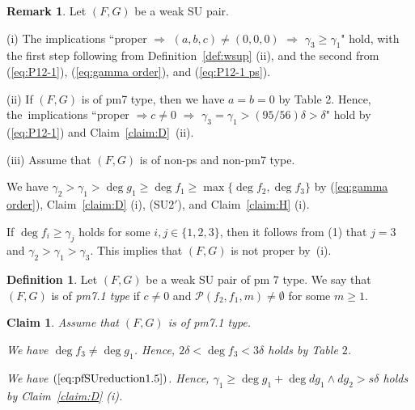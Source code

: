 \documentclass{amsart}
\theoremstyle{plain}
\newtheorem{claim}{Claim}
\theoremstyle{definition}
\newtheorem{definition}[thm]{Definition}
\newtheorem{rem}[thm]{Remark}
\newcommand{\nd}{\noindent}
\begin{document}
\begin{rem}\label{rem:diff forms}\rm 
Let $(F,G)$ be a weak SU pair. 


\nd (i) 
The implications 
``proper $\Rightarrow $ $(a,b,c)\ne (0,0,0)$ 
$\Rightarrow $ $\gamma _3\ge \gamma _1$" hold, 
with the first step following from Definition~\ref{def:wsup} (ii), 
and the second from 
(\ref{eq:P12-1}), 
(\ref{eq:gamma order}), 
and (\ref{eq:P12-1 ps}). 


\nd (ii) 
If $(F,G)$ is of pm7 type, 
then we have $a=b=0$ by Table 2. 
Hence, 
the~implications 
``proper 
$\Rightarrow c\ne 0$ 
$\Rightarrow $ 
$\gamma _3=\gamma _1>(95/56)\delta >\delta $" 
hold by (\ref{eq:P12-1}) and Claim~\ref{claim:D}~(ii). 


\nd (iii) 
Assume that $(F,G)$ is of non-ps and non-pm7 type. 


\nd {\rm (1)} 
We have 
$\gamma _2>\gamma _1>\deg g_1\ge \deg f_1\ge \max \{ \deg f_2,\deg f_3\} $ 
by (\ref{eq:gamma order}), 
Claim~\ref{claim:D} (i), 
(SU$2'$), 
and Claim~\ref{claim:H} (i). 


\nd {\rm (2)} 
If $\deg f_i\ge \gamma _j$ holds for some $i,j\in \{ 1,2,3\} $, 
then it follows from (1) that 
$j=3$ and $\gamma _2>\gamma _1>\gamma _3$. 
This implies that $(F,G)$ is not proper by~(i). 

\end{rem}




\begin{definition}\label{def:pm7.1}\rm 
Let $(F,G)$ be a weak SU pair of pm 7 type. 
We say that $(F,G)$ is of {\it pm7.1 type} if 
$c\ne 0$ 
and $\mathcal{P}(f_2,f_1,m)\ne \emptyset $ 
for some $m\ge 1$. 
\end{definition}


\begin{claim}\label{claim:pm7.1}
Assume that $(F,G)$ is of pm7.1 type. 

\nd{\rm (i)} 
We have $\deg f_3\ne \deg g_1$. 
Hence, $2\delta <\deg f_3<3\delta $ holds by Table $2$. 



\nd{\rm (ii)} 
We have $(\ref{eq:pfSUreduction1.5})$. 
Hence, 
$\gamma _1\ge \deg g_1+\deg dg_1\wedge dg_2>s\delta $ 
holds by Claim~{\rm \ref{claim:D} (i)}. 

\end{claim}
\end{document}
